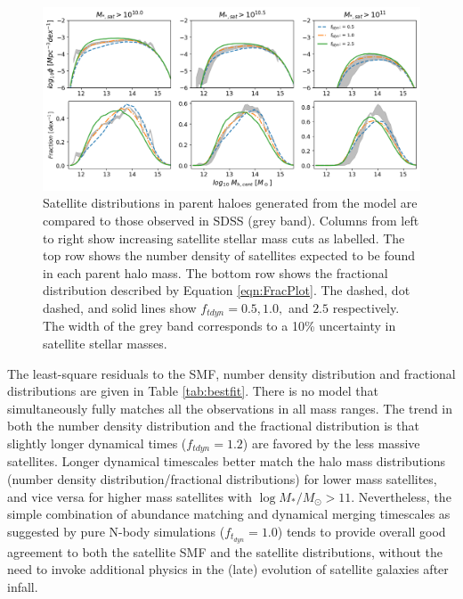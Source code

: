 \begin{figure}[h]
	\centering
	\includegraphics[width = \linewidth]{Figures/Chapter3/Tdyn_Sat_Dist.png}
	\caption{Satellite distributions in parent haloes generated from the model are compared to those observed in SDSS (grey band). Columns from left to right show increasing satellite stellar mass cuts as labelled. The top row shows the number density of satellites expected to be found in each parent halo mass. The bottom row shows the fractional distribution described by Equation \ref{eqn:FracPlot}. The dashed, dot dashed, and solid lines show $f_{tdyn} = 0.5, 1.0,$ and $2.5$ respectively. The width of the grey band corresponds to a 10\% uncertainty in satellite stellar masses.}
	\label{fig:Sat_Dist_Tdyn}
\end{figure}

The least-square residuals to the SMF, number density distribution and fractional distributions are given in Table \ref{tab:bestfit}. There is no model that simultaneously fully matches all the observations in all mass ranges. The trend in both the number density distribution and the fractional distribution is that slightly longer dynamical times ($f_{tdyn}  = 1.2$) are favored by the less massive satellites. Longer dynamical timescales better match the halo mass distributions (number density distribution/fractional distributions) for lower mass satellites, and vice versa for higher mass satellites with $\log M_{*}/M_{\odot} >11$. Nevertheless, the simple combination of abundance matching and dynamical merging timescales as suggested by pure N-body simulations ($f_{t_{dyn}} = 1.0$) tends to provide overall good agreement to both the satellite SMF and the satellite distributions, without the need to invoke additional physics in the (late) evolution of satellite galaxies after infall.

